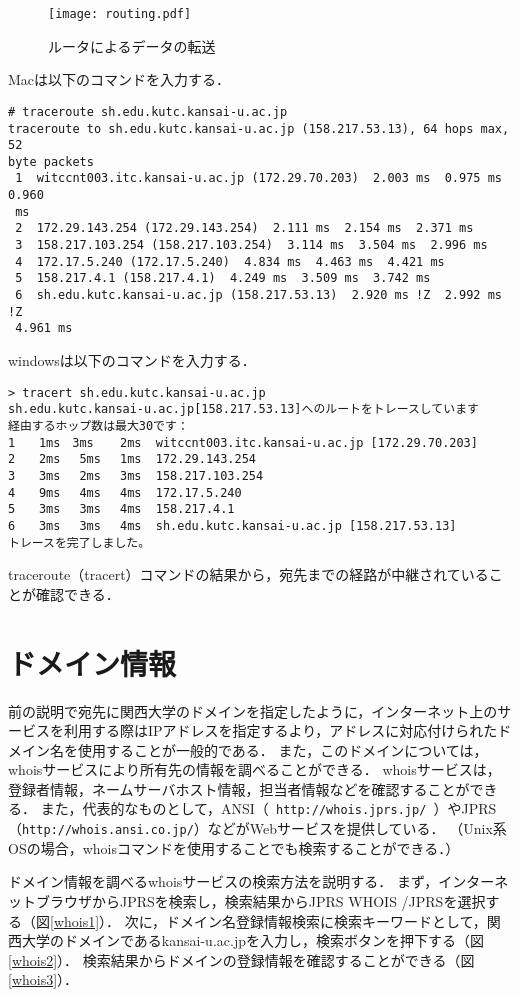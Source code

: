 \begin{figure}[tbp]
 \begin{center}
  \texttt{[image: routing.pdf]}
 \end{center}
 \caption{ルータによるデータの転送}
 \label{router}
\end{figure}
\newpage
Macは以下のコマンドを入力する．
\begin{screen}
\begin{verbatim}
# traceroute sh.edu.kutc.kansai-u.ac.jp
traceroute to sh.edu.kutc.kansai-u.ac.jp (158.217.53.13), 64 hops max, 52 
byte packets
 1  witccnt003.itc.kansai-u.ac.jp (172.29.70.203)  2.003 ms  0.975 ms  0.960 
 ms
 2  172.29.143.254 (172.29.143.254)  2.111 ms  2.154 ms  2.371 ms
 3  158.217.103.254 (158.217.103.254)  3.114 ms  3.504 ms  2.996 ms
 4  172.17.5.240 (172.17.5.240)  4.834 ms  4.463 ms  4.421 ms
 5  158.217.4.1 (158.217.4.1)  4.249 ms  3.509 ms  3.742 ms
 6  sh.edu.kutc.kansai-u.ac.jp (158.217.53.13)  2.920 ms !Z  2.992 ms !Z  
 4.961 ms
 \end{verbatim}
\end{screen}

windowsは以下のコマンドを入力する．
\begin{screen}
\begin{Verbatim}[frame=single]
> tracert sh.edu.kutc.kansai-u.ac.jp
sh.edu.kutc.kansai-u.ac.jp[158.217.53.13]へのルートをトレースしています
経由するホップ数は最大30です：
1　　1ms　3ms　  2ms  witccnt003.itc.kansai-u.ac.jp [172.29.70.203]
2　　2ms 　5ms 　1ms  172.29.143.254
3　　3ms 　2ms 　3ms  158.217.103.254
4　　9ms 　4ms 　4ms  172.17.5.240
5　　3ms 　3ms 　4ms  158.217.4.1
6　　3ms 　3ms 　4ms  sh.edu.kutc.kansai-u.ac.jp [158.217.53.13]
トレースを完了しました。
\end{Verbatim}
\end{screen}
traceroute（tracert）コマンドの結果から，宛先までの経路が中継されていることが確認できる．

\section{ドメイン情報}
前の説明で宛先に関西大学のドメインを指定したように，インターネット上のサービスを利用する際はIPアドレスを指定するより，アドレスに対応付けられたドメイン名を使用することが一般的である．
また，このドメインについては，whoisサービスにより所有先の情報を調べることができる．
whoisサービスは，登録者情報，ネームサーバホスト情報，担当者情報などを確認することができる．
また，代表的なものとして，ANSI（\verb| http://whois.jprs.jp/ |）やJPRS（\verb|http://whois.ansi.co.jp/|）などがWebサービスを提供している．
（Unix系OSの場合，whoisコマンドを使用することでも検索することができる．）\par
ドメイン情報を調べるwhoisサービスの検索方法を説明する．
まず，インターネットブラウザからJPRSを検索し，検索結果からJPRS WHOIS /JPRSを選択する（図\ref{whois1}）．
次に，ドメイン名登録情報検索に検索キーワードとして，関西大学のドメインであるkansai-u.ac.jpを入力し，検索ボタンを押下する（図\ref{whois2}）．
検索結果からドメインの登録情報を確認することができる（図\ref{whois3}）．

